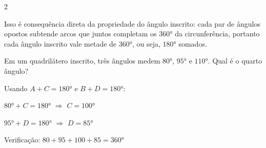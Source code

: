 \documentclass[12pt]{article}
\begin{document}
\begin{multicols}{2}

Isso é consequência direta da propriedade do ângulo inscrito: cada par de ângulos opostos subtende arcos que juntos completam os \ang{360} da circunferência, portanto cada ângulo inscrito vale metade de \ang{360}, ou seja, \ang{180} somados.


Em um quadrilátero inscrito, três ângulos medem $\ang{80}$, $\ang{95}$ e $\ang{110}$. Qual é o quarto ângulo?

Usando $A + C = \ang{180}$ e $B + D = \ang{180}$:

\vspace{8px}
$\ang{80} + C = \ang{180}$ \quad $\Rightarrow$ \quad $C = \ang{100}$

$\ang{95} + D = \ang{180}$ \quad $\Rightarrow$ \quad $D = \ang{85}$

Verificação: $80 + 95 + 100 + 85 = \ang{360}$ \checkmark

\end{multicols}


\end{document}
